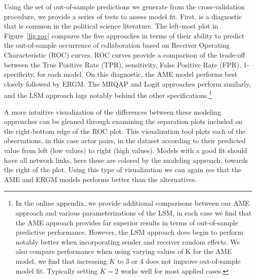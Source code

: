 \documentclass[11pt,pdflatex]{elsarticle}
\begin{document}
Using the set of out-of-sample predictions we generate from the cross-validation procedure, we provide a series of tests to assess model fit. First, is a diagnostic that is common in the political science literature. The left-most plot in Figure~\ref{fig:roc} compares the five approaches in terms of their ability to predict the out-of-sample occurrence of collaboration based on Receiver Operating Characteristic (ROC) curves. ROC curves provide a comparison of the trade-off between the True Positive Rate (TPR), sensitivity, False Positive Rate (FPR), 1-specificity, for each model. %
On this diagnostic, the AME model performs best closely followed by ERGM. The MRQAP and Logit approaches perform similarly, and the LSM approach lags notably behind the other specifications.\footnote{In the online appendix, we provide additional comparisons between our AME approach and various parameterizations of the LSM, in each case we find that the AME approach provides far superior results in terms of out-of-sample predictive performance. However, the LSM approach does begin to perform notably better when incorporating sender and receiver random effects. We also compare performance when using varying values of K for the AME model, we find that increasing $K$ to 3 or 4 does not improve out-of-sample model fit. Typically setting $K=2$ works well for most applied cases.} 

A more intuitive visualization of the differences between these modeling approaches can be gleaned through examining the separation plots included on the right-bottom edge of the ROC plot. This visualization tool plots each of the observations, in this case actor pairs, in the dataset according to their predicted value from left (low values) to right (high values). Models with a good fit should have all network links, here these are colored by the modeling approach, towards the right of the plot. Using this type of visualization we can again see that the AME and ERGM models performs better than the alternatives.
\end{document}
